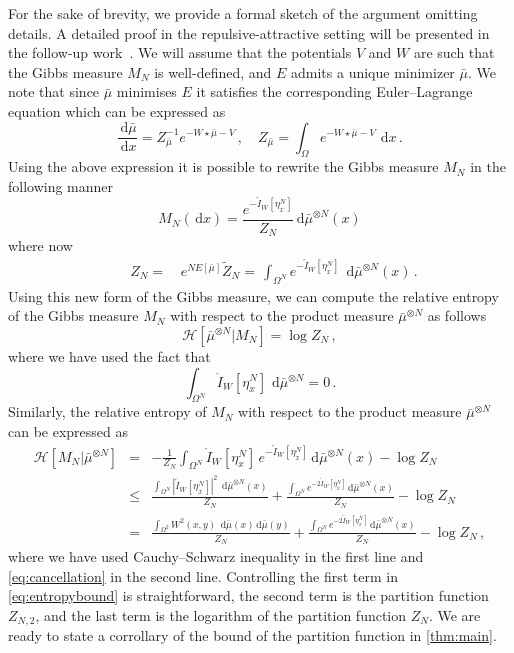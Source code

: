 \documentclass[a4paper,10pt,twoside]{amsart}
\newcommand{\dx}[1]{\,\mathrm{d}#1}  %
\theoremstyle{remark}
\theoremstyle{definition}
\numberwithin{equation}{section}
\newcommand{\0}{{\bf 0}}
\newcommand{\+}{\hspace{-.5ex}+\hspace{-.5ex}}
\begin{document}
For the sake of brevity, we provide a formal sketch of the argument omitting details. A detailed proof in the repulsive-attractive setting will be presented in the follow-up work~\cite{Delgadino2025}.  We will assume that the potentials $V$ and $W$ are such that the Gibbs measure $M_N$ is well-defined, and $E$ admits a unique minimizer $\bar{\mu}$. We note that since $\bar{\mu}$ minimises $E$ it satisfies the corresponding Euler--Lagrange equation  which can be expressed as
\begin{equation}
  \frac{\dx{\bar{\mu}}}{\dx{x}} =Z_{\bar{\mu}}^{-1} e^{-W\star \bar \mu -V}\, , \quad Z_{\bar{\mu}}=\int_{\Omega} e^{-W\star \bar \mu -V}\, \dx{x}\, .
\end{equation}
Using the above expression it is possible to rewrite the Gibbs measure $M_N$ in the following manner
\begin{equation}
  M_N (\dx{x})=\frac{e^{-\mathring{I}_W[\eta^N_x]}}{Z_{N}} \dx \bar\mu^{\otimes N}(x)
\end{equation}
where now
\begin{align}
 \qquad Z_{N}= &\, e^{N E[\bar{\mu}]}\tilde{Z}_N = \, \int_{\Omega^N}e^{-\mathring{I}_W[\eta^N_x]} \;\dx \bar\mu^{\otimes N}(x) \, .
\end{align}
Using this new form of the Gibbs measure, we can compute the relative entropy of the Gibbs measure $M_N$ with respect to the product measure $\bar{\mu}^{\otimes N}$ as follows
\begin{equation}
   \mathcal{H}[\bar{\mu}^{\otimes N}|M_N] = \log Z_{N}\, ,
\end{equation} 
where we have used the fact that
\begin{equation}\label{eq:cancellation}
  \int_{\Omega^N} \mathring{I}_W[\eta^N_x]\, \dx{\bar \mu}^{\otimes N}=0 \, .
\end{equation}
Similarly, the relative entropy of $M_N$ with respect to the product measure $\bar{\mu}^{\otimes N}$ can be expressed as
\begin{eqnarray}
  \mathcal{H}[M_N|\bar{\mu}^{\otimes N}] &=&  -\frac{1}{Z_{N}}\int_{\Omega^N}\mathring{I}_W[\eta^N_x] \, e^{-\mathring{I}_W[\eta^N_x]}\dx{\bar{\mu}^{\otimes N}}(x)  -\log Z_{N}\nonumber\\
   &\le& \frac{\int_{\Omega^N}|\mathring{I}_W[\eta^N_x]|^2\;\dx{\bar{\mu}^{\otimes N}}(x)}{Z_{N}}+ \frac{\int_{\Omega^N} e^{-2\mathring{I}_W[\eta^N_x]}\dx{\bar{\mu}^{\otimes N}}(x)}{Z_N}  -\log Z_{N}\,\nonumber \\
    &=& \frac{\int_{\Omega^2} W^2(x,y)\;\dx\bar\mu(x)\dx\bar\mu(y)}{Z_N}+\frac{\int_{\Omega^N} e^{-2\mathring{I}_W[\eta^N_x]}\dx{\bar{\mu}^{\otimes N}}(x)}{Z_N}  -\log Z_{N}\, ,
\label{eq:entropybound}
\end{eqnarray}
where we have used Cauchy--Schwarz inequality in the first line and \eqref{eq:cancellation} in the second line. Controlling the first term in \eqref{eq:entropybound} is straightforward, the second term is the partition function $Z_{N,2}$, and the last term is the logarithm of the partition function $Z_N$. We are ready to state a corrollary of the bound of the partition function in \cref{thm:main}.
\end{document}
